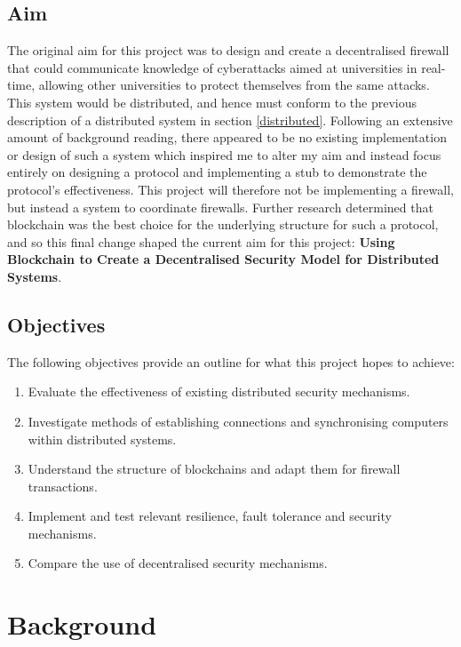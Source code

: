 \documentclass[a4paper, 11pt]{report}
\begin{document}
\section{Aim} \label{aim}
The original aim for this project was to design and create a decentralised firewall that could communicate knowledge of cyberattacks aimed at universities in real-time, allowing other universities to protect themselves from the same attacks. This system would be distributed, and hence must conform to the previous description of a distributed system in section \ref{distributed}. Following an extensive amount of background reading, there appeared to be no existing implementation or design of such a system which inspired me to alter my aim and instead focus entirely on designing a protocol and implementing a \gls{stub} to demonstrate the protocol's effectiveness. This project will therefore not be implementing a firewall, but instead a system to coordinate firewalls. Further research determined that \gls{blockchain} was the best choice for the underlying structure for such a protocol, and so this final change shaped the current aim for this project: \textbf{Using Blockchain to Create a Decentralised Security Model for Distributed Systems}.

\section{Objectives}
The following objectives provide an outline for what this project hopes to achieve:

\begin{enumerate}
    \item Evaluate the effectiveness of existing distributed security mechanisms.
    \item Investigate methods of establishing connections and synchronising computers within distributed systems.
    \item Understand the structure of \gls{blockchain}s and adapt them for firewall transactions.
    \item Implement and test relevant resilience, fault tolerance and security mechanisms.
    \item Compare the use of decentralised security mechanisms.
\end{enumerate}

\chapter{Background}
\end{document}
